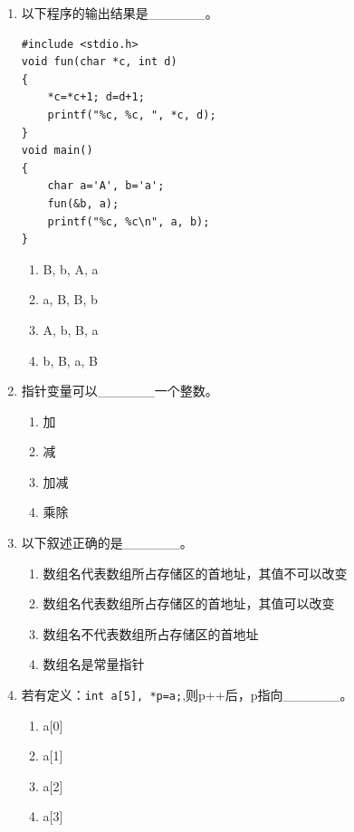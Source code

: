 \documentclass[a4paper,12pt]{article}
\begin{document}
\begin{enumerate}
	\item 以下程序的输出结果是\_\_\_\_\_\_。
	      \begin{verbatim}
#include <stdio.h>
void fun(char *c, int d)
{
    *c=*c+1; d=d+1;
    printf("%c, %c, ", *c, d);
}
void main()
{
    char a='A', b='a';
    fun(&b, a);
    printf("%c, %c\n", a, b);
}
    \end{verbatim}
	      \begin{enumerate}
		      \item[A)] B, b, A, a
		      \item[B)] a, B, B, b
		      \item[C)] A, b, B, a
		      \item[D)] b, B, a, B
	      \end{enumerate}
	      \vspace{0.3cm}

	\item 指针变量可以\_\_\_\_\_\_一个整数。
	      \begin{enumerate}
		      \item[A)] 加
		      \item[B)] 减
		      \item[C)] 加减
		      \item[D)] 乘除
	      \end{enumerate}
	      \vspace{0.3cm}

	\item 以下叙述正确的是\_\_\_\_\_\_。
	      \begin{enumerate}
		      \item[A)] 数组名代表数组所占存储区的首地址，其值不可以改变
		      \item[B)] 数组名代表数组所占存储区的首地址，其值可以改变
		      \item[C)] 数组名不代表数组所占存储区的首地址
		      \item[D)] 数组名是常量指针
	      \end{enumerate}
	      \vspace{0.3cm}

	\item 若有定义：\texttt{int a[5], *p=a;},则p++后，p指向\_\_\_\_\_\_。
	      \begin{enumerate}
		      \item[A)] a[0]
		      \item[B)] a[1]
		      \item[C)] a[2]
		      \item[D)] a[3]
	      \end{enumerate}
	      \vspace{0.3cm}


\end{enumerate}
\end{document}
